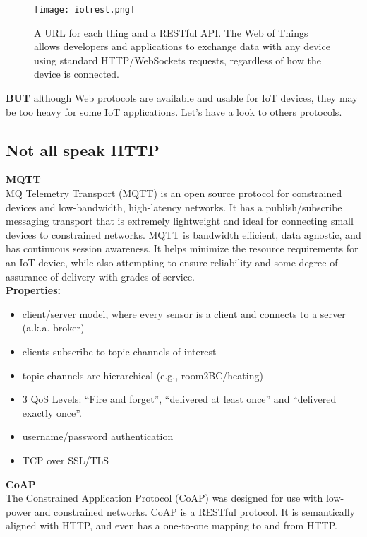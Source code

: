 \begin{figure}[H]
  \centering
  \texttt{[image: iotrest.png]}
  \caption{A URL for each thing and a RESTful API.
The Web of Things allows developers and applications to exchange data with any
device using standard HTTP/WebSockets requests, regardless of how the device is
connected.}
  \label{fig:iotrest}
\end{figure}

\textbf{BUT} although Web protocols are available and usable for IoT devices,
they may be too heavy for some IoT applications. Let's have a look to others
protocols.

\subsection{Not all speak HTTP}

\textbf{MQTT}\\

MQ Telemetry Transport (MQTT) is an open source protocol for constrained
devices and low-bandwidth, high-latency networks.
It has a publish/subscribe messaging transport that is extremely lightweight
and ideal for connecting small devices to constrained networks.
MQTT is bandwidth efficient, data agnostic, and has continuous session
awareness. It helps minimize the resource requirements for an IoT device,
while also attempting to ensure reliability and some degree of assurance of
delivery with grades of service.\\

\textbf{Properties:}

\begin{itemize}
  \item client/server model, where every sensor is a client and connects to a
server (a.k.a. broker)
  \item clients subscribe to topic channels of interest
  \item topic channels are hierarchical (e.g., room2BC/heating)
  \item 3 QoS Levels: ``Fire and forget'',  ``delivered at least once'' and
 ``delivered exactly once''.
  \item username/password authentication
  \item TCP over SSL/TLS
\end{itemize}

\textbf{CoAP}\\

The Constrained Application Protocol (CoAP) was designed for use with low-power
and constrained networks. CoAP is a RESTful protocol. It is semantically
aligned with HTTP, and even has a one-to-one mapping to and from HTTP.\\

